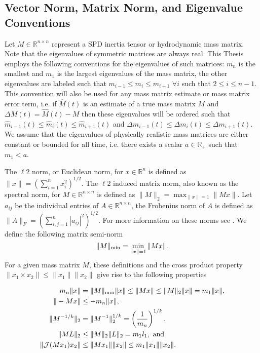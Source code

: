 \subsection{Vector Norm, Matrix Norm, and Eigenvalue  Conventions}
\label{chModels.sec.normConventions}

Let $M\in\mathbb{R}^{n\times n}$ represent a \ac{SPD} inertia tensor
or hydrodynamic mass matrix. Note that the eigenvalues of symmetric
matrices are always real.  This Thesis employs the following
conventions for the eigenvalues of such matrices: $m_n$ is the
smallest and $m_1$ is the largest eigenvalues of the mass matrix, the
other eigenvalues are labeled such that $m_{i-1}\leq m_i\leq
m_{i+1}$ $\forall i$ such that $2\leq i\leq n-1$. This convention will also be used for any mass matrix
estimate or mass matrix error term, i.e. if $\hat{M}(t)$ is an
estimate of a true mass matrix $M$ and $\Delta M(t)=\hat{M}(t)-M$ then
these eigenvalues will be ordered such that $\hat{m}_{i-1}(t)\leq
\hat{m}_i(t) \leq \hat{m}_{i+1}(t)$ and $\Delta m_{i-1}(t)\leq \Delta
m_i(t) \leq \Delta m_{i+1}(t)$. We assume that the eigenvalues of
physically realistic mass matrices are either constant or bounded for
all time, i.e. there exists a scalar $a\in\mathbb{R}_+$ such that
$m_1<a$.



The $\ell 2$ norm, or Euclidean norm, for $x\in\mathbb{R}^n$ is
defined as $\|x\|=\left(\sum_{i=1}^n x_i^2\right)^{1/2}$.  The $\ell 2$ induced
matrix norm, also known as the spectral norm, for $M\in\mathbb{R}^{n
  \times n}$ is defined as $\|M\|_2=\max_{\|x\|=1}\|Mx\|$.  Let
$a_{ij}$ be the individual entries of $A\in\mathbb{R}^{n\times n}$,
the Frobenius norm of $A$ is defined as
$\|A\|_F=\left(\sum_{i,j=1}^n|a_{ij}|^{2} \right)^{1/2}$.  For more
information on these norms see \cite{horn&johnson}. We define the
following matrix semi-norm
%
\begin{equation}
\|M\|_{\text{min}}=\min_{\|x\|=1}\|Mx\|.
\end{equation}
%
For a given mass matrix $M$, these definitions and the cross product
property $\|x_1\times x_2\|\leq \|x_1\|\|x_2\|$ give rise to the
following properties

\begin{align}\label{chModels.eq.AVO_ineq}
  m_n\|x\|&=\|M\|_{\text{min}}\|x\|\leq\|Mx\|\leq\|M\|_2\|x\|=m_1\|x\|, 
   \\
  \|-Mx\|&\leq-m_n\|x\|,
   \\
  \|M^{-1/k}\|_2&=\|M^{-1}\|_2^{1/k}=\left(\frac{1}{m_n}\right)^{1/k},
   \\
  \|M L\|_2&\leq\|M\|_2\|L\|_2=m_{1} l_{1},~ \text{and} 
   \\ 
  \|\mathcal{J}(M x_1)x_2\|&\leq\|M x_1\|\|x_2\|\leq m_1\|x_1\|\|x_2\|.
\end{align}


